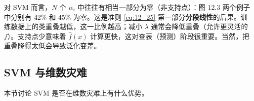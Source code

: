 \begin{remark}
对 SVM 而言，$N$ 个 $\alpha_i$ 中往往有相当一部分为零（非支持点）：图 12.3 两个例子中分别有 42\% 和 45\% 为零。这是准则 \ref{eq:12_25} 第一部分\textbf{分段线性}的后果。训练数据上的类重叠越低，这一比例越高；减小 $\lambda$ 通常会降低重叠（允许更灵活的 $f$）。支持点少意味着 $\hat f(x)$ 计算更快，这对查表（预测）阶段很重要。当然，把重叠降得太低会导致泛化变差。
\end{remark}

\subsection{SVM 与维数灾难}

本节讨论 SVM 是否在维数灾难上有什么优势。

